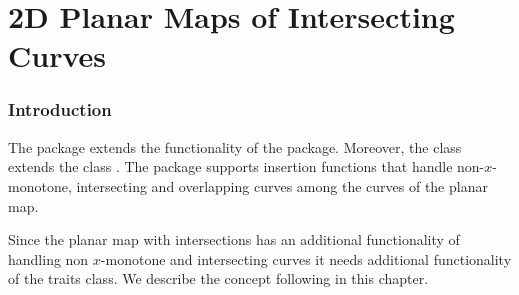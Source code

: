



\chapter{2D Planar Maps of Intersecting Curves}

\subsection*{Introduction}

The  package extends the
functionality of the  package. Moreover, the class
 extends the class
. The  package
supports insertion functions that handle non-$x$-monotone,
intersecting and overlapping curves among the curves of
the planar map.

Since the planar map with intersections has an additional
functionality of handling non $x$-monotone and intersecting curves
it needs additional functionality of the traits class. We describe
the  concept following in
this chapter. 

